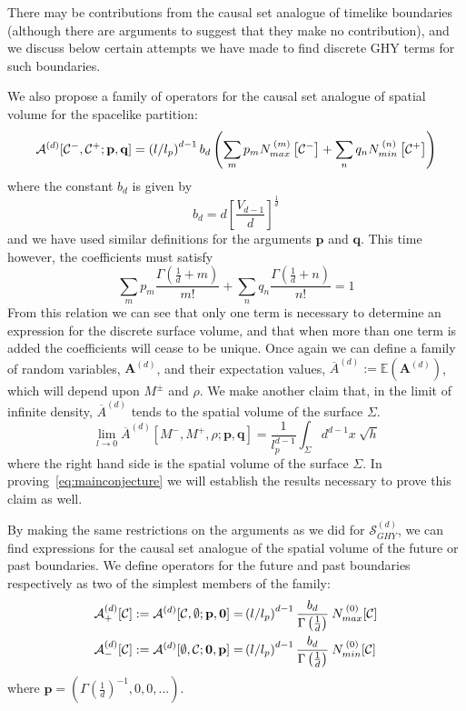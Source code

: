 \documentclass[12pt]{article}
\newcommand{\be}{\begin{equation}}
\newcommand{\ee}{\end{equation}}
\begin{document}
There may be contributions from the causal set analogue of timelike boundaries (although there are arguments to suggest that they make no contribution), and we discuss below certain attempts we have made to find discrete GHY terms for such boundaries.

We also propose a family of operators for the causal set analogue of spatial volume for the spacelike partition:
\be\label{general_area_sum}
\mathcal{A}^{(d)}[\mathcal{C}^-,\mathcal{C}^+;\mathbf{p},\mathbf{q}]=\left(l/l_p\right)^{d-1}b_{d}\left(\sum_m p_m N_{\vphantom{i}max}^{\: (m)}\left[\mathcal{C}^- \right] + \sum_n q_n N_{min}^{\: (n)}\left[\mathcal{C}^+ \right]\right)
\ee
where the constant $b_d$ is given by
\be\label{constant_b_d}
b_d=d\left[\frac{V_{d-1}}{d}\right]^{\frac{1}{d}}
\ee
and we have used similar definitions for the arguments $\mathbf{p}$ and $\mathbf{q}$. This time however, the coefficients must satisfy 
\be\label{area_coefficient_relation}
\sum_m p_m \frac{\Gamma\left(\frac{1}{d}+m \right)}{m!}  + \sum_n q_n\frac{\Gamma\left(\frac{1}{d}+n \right)}{n!}=1
\ee
From this relation we can see that only one term is necessary to determine an expression for the discrete surface volume, and that when more than one term is added the coefficients will cease to be unique. Once again we can define a family of random variables, $\textbf{A}^{(d)}$, and their expectation values, $\overline{A}^{(d)}:=\mathbb{E}(\textbf{A}^{(d)})$, which will depend upon $M^{\pm}$ and $\rho$. We make another claim that, in the limit of infinite density, $\overline{A}^{(d)}$ tends to the spatial volume of the surface $\Sigma$.
\be\label{eq:conjecture_for_area}
\lim_{l\rightarrow0}\overline{A}^{(d)}[M^-,M^+,\rho;\mathbf{p} , \mathbf{q}]= \frac{1}{l_p^{d-1}}\int_{\Sigma} d^{d-1}x\: \sqrt{h}
\ee
where the right hand side is the spatial volume of the surface $\Sigma$. In proving~\eqref{eq:mainconjecture} we will establish the results necessary to prove this claim as well.

By making the same restrictions on the arguments as we did for $\mathcal{S}^{(d)}_{GHY}$, we can find expressions for the causal set analogue of the spatial volume of the future or past boundaries. We define operators for the future and past boundaries respectively as two of the simplest members of the family:
\begin{align}\label{eq:future_past_spatial_volume}
\mathcal{A}^{(d)}_{+}[\mathcal{C}]:=\mathcal{A}^{(d)}[\mathcal{C},\emptyset;\mathbf{p},\mathbf{0}]= & \left(l/l_p\right)^{d-1}\frac{b_{d}}{\Gamma\left(\frac{1}{d}\right)}\: N_{\vphantom{i}max}^{\: (0)}[\mathcal{C}]
\\
\mathcal{A}^{(d)}_{-}[\mathcal{C}]:=\mathcal{A}^{(d)}[\emptyset,\mathcal{C};\mathbf{0},\mathbf{p}]= & \left(l/l_p\right)^{d-1}\frac{b_{d}}{\Gamma\left(\frac{1}{d}\right)}\: N_{min}^{\: (0)}[\mathcal{C}]
\end{align}
where $\mathbf{p}=(\Gamma\left(\frac{1}{d}\right)^{-1},0,0,...)$.
\end{document}
